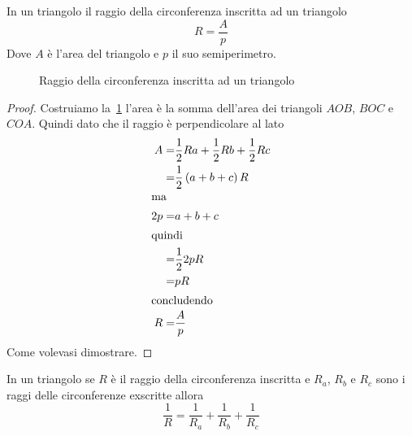 \begin{thm}\label{thm:raggiocirconferenzainscrittatriangolo}
In un triangolo il raggio della circonferenza inscritta ad un triangolo
\[R=\dfrac{A}{p}\]
Dove $A$ è l'area del triangolo e $p$ il suo semiperimetro.
\end{thm}
\begin{figure}
	\centering
	
	\caption{Raggio della circonferenza inscritta ad un triangolo}
	\label{fig:raggiocirconferenzainscrittatriangolo}
\end{figure}
\begin{proof}
		Costruiamo la~\cref{fig:raggiocirconferenzainscrittatriangolo} l'area è la somma dell'area dei  triangoli $AOB$, $BOC$ e $COA$. Quindi dato che il raggio è perpendicolare al lato
		\begin{align*}
			A=&\dfrac{1}{2}Ra+\dfrac{1}{2}Rb+\dfrac{1}{2}Rc\\
			=&\dfrac{1}{2}\left(a+b+c\right)R\\
			\intertext{ma}
			2p=&a+b+c\\
			\intertext{quindi}
			=&\dfrac{1}{2}2pR\\
			=&pR\\
			\intertext{concludendo}
			R=&\dfrac{A}{p}\\
		\end{align*}
	Come volevasi dimostrare.
\end{proof} 
\begin{thm}\label{thm:Raggiocirconferenzainscrittaexscritta}
	In un triangolo se $R$ è il raggio della circonferenza inscritta e $R_a$, $R_b$ e $R_c$ sono i raggi delle circonferenze exscritte allora\[\dfrac{1}{R}=\dfrac{1}{R_a}+\dfrac{1}{R_b}+\dfrac{1}{R_c}\]
\end{thm}
